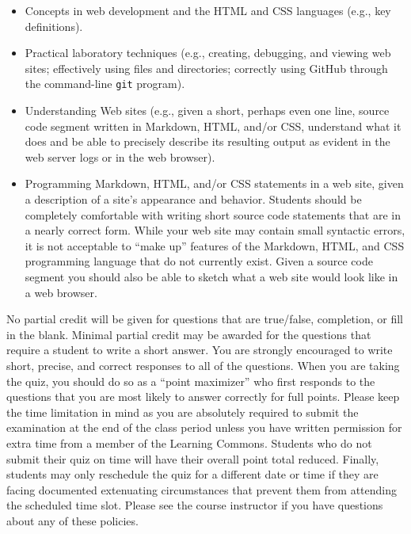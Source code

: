 \documentclass[11pt]{article}
\begin{document}
\vspace*{-.05in}
\begin{itemize}

  \itemsep 0in

  \item Concepts in web development and the HTML and CSS languages (e.g., key
    definitions).

  \item Practical laboratory techniques (e.g., creating, debugging, and viewing
    web sites; effectively using files and directories; correctly using GitHub
    through the command-line {\tt git} program).

  \item Understanding Web sites (e.g., given a short, perhaps even one line,
    source code segment written in Markdown, HTML, and/or CSS, understand what
    it does and be able to precisely describe its resulting output as evident in
    the web server logs or in the web browser).

  \item Programming Markdown, HTML, and/or CSS statements in a web site, given a
    description of a site's appearance and behavior. Students should be
    completely comfortable with writing short source code statements that are in
    a nearly correct form. While your web site may contain small syntactic
    errors, it is not acceptable to ``make up'' features of the Markdown, HTML,
    and CSS programming language that do not currently exist. Given a source
    code segment you should also be able to sketch what a web site would look
    like in a web browser.

\end{itemize}

\noindent No partial credit will be given for questions that are true/false,
completion, or fill in the blank. Minimal partial credit may be awarded for the
questions that require a student to write a short answer. You are strongly
encouraged to write short, precise, and correct responses to all of the
questions. When you are taking the quiz, you should do so as a ``point
maximizer'' who first responds to the questions that you are most likely to
answer correctly for full points. Please keep the time limitation in mind as you
are absolutely required to submit the examination at the end of the class period
unless you have written permission for extra time from a member of the Learning
Commons. Students who do not submit their quiz on time will have their overall
point total reduced. Finally, students may only reschedule the quiz for a
different date or time if they are facing documented extenuating circumstances
that prevent them from attending the scheduled time slot. Please see the course
instructor if you have questions about any of these policies.
\end{document}
